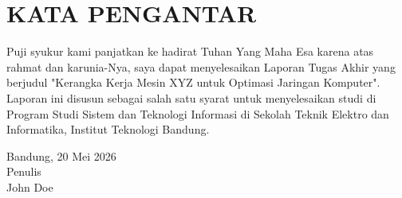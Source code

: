 \chapter*{KATA PENGANTAR}

Puji syukur kami panjatkan ke hadirat Tuhan Yang Maha Esa karena atas rahmat dan karunia-Nya, saya dapat menyelesaikan Laporan Tugas Akhir yang berjudul "Kerangka Kerja Mesin XYZ untuk Optimasi Jaringan Komputer". Laporan ini disusun sebagai salah satu syarat untuk menyelesaikan studi di Program Studi Sistem dan Teknologi Informasi di Sekolah Teknik Elektro dan Informatika, Institut Teknologi Bandung.
\begin{flushright}
    Bandung, 20 Mei 2026\\
    
    Penulis \\
    \vspace{1cm}
    John Doe
\end{flushright}
